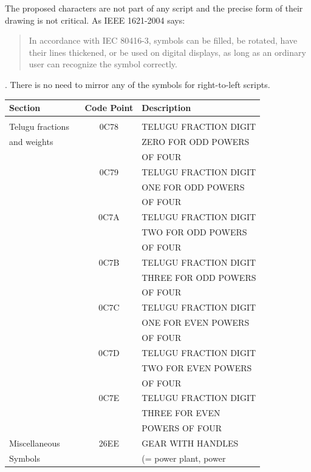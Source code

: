 \documentclass[10pt,a4paper]{article}
\begin{document}
The proposed characters are not part of any script and the precise form of
their drawing is not critical. As IEEE 1621-2004 says:

\begin{quote}
In accordance with IEC 80416-3, symbols can be filled, be rotated, have their lines
thickened, or be used on digital displays, as long as an ordinary user can recognize
the symbol correctly.
\end{quote}

\noindent \cite[\S 4.3]{IEEE1621}. There is no need to mirror any of the symbols for
right-to-left scripts.

\begin{table}[htbp]
	\centering
	\begin{tabular}{lcl}
		\textbf{Section} & \textbf{Code Point} & \textbf{Description} \\
		\hline \\
		Telugu fractions \
			& 0C78 & TELUGU FRACTION DIGIT \\
		and weights	& & ZERO FOR ODD POWERS \\
				& & OF FOUR \\
			& 0C79 & TELUGU FRACTION DIGIT \\
				& & ONE FOR ODD POWERS \\
				& & OF FOUR \\
			& 0C7A & TELUGU FRACTION DIGIT \\
				& & TWO FOR ODD POWERS \\
				& & OF FOUR \\
			& 0C7B & TELUGU FRACTION DIGIT \\
				& & THREE FOR ODD POWERS \\
				& & OF FOUR \\
			& 0C7C & TELUGU FRACTION DIGIT \\
				& & ONE FOR EVEN POWERS \\
				& & OF FOUR \\
			& 0C7D & TELUGU FRACTION DIGIT \\
				& & TWO FOR EVEN POWERS \\
				& & OF FOUR \\
			& 0C7E & TELUGU FRACTION DIGIT \\
				& & THREE FOR EVEN \\
				& & POWERS OF FOUR \\
		\hline
		Miscellaneous \
			& 26EE & GEAR WITH HANDLES \\
		Symbols & & (= power plant, power \\

\end{tabular}
\end{table}
\end{document}
